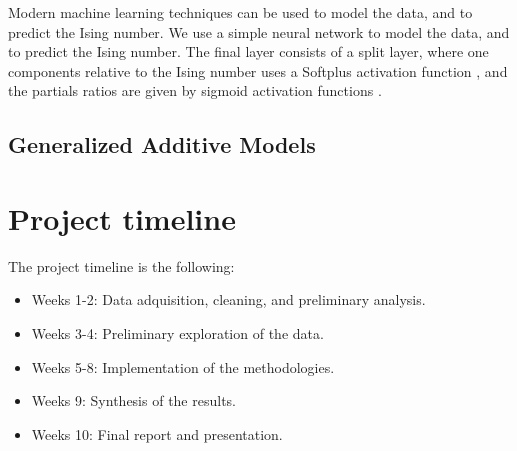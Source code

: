 \documentclass{psu-report}
\begin{document}
Modern machine learning techniques can be used to model the data, and to
predict the Ising number.
We use a simple neural network to model the data, and to predict the Ising
number.
The final layer consists of a split layer, where one components relative to the
Ising number uses a Softplus activation function , and the
partials ratios are given by sigmoid activation functions .

\subsection{Generalized Additive Models}


\section{Project timeline}

The project timeline is the following:
\begin{itemize}
    \item Weeks 1-2: Data adquisition, cleaning, and preliminary analysis.
    \item Weeks 3-4: Preliminary exploration of the data.
    \item Weeks 5-8: Implementation of the methodologies.
    \item Weeks 9: Synthesis of the results.
    \item Weeks 10: Final report and presentation.
\end{itemize}

\nocite{*} %
\printchicagobibliography


\end{document}
